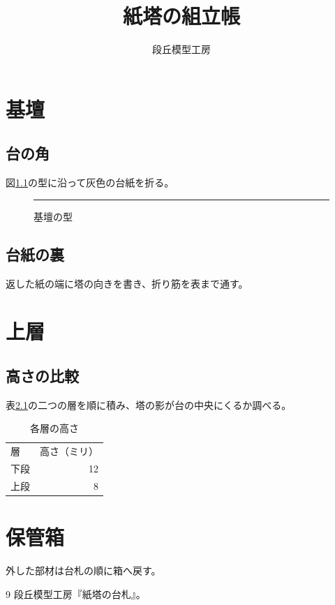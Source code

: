 \documentclass{ltjbook}
\title{紙塔の組立帳}
\author{段丘模型工房}
\date{}
\begin{document}
\frontmatter
\maketitle
\tableofcontents
\mainmatter
\chapter{基壇}
\section{台の角}
図\ref{fig:base}の型に沿って灰色の台紙を折る。
\begin{figure}[htbp]
\centering\rule{34mm}{4mm}
\caption{基壇の型}\label{fig:base}
\end{figure}
\newpage
\section{台紙の裏}
返した紙の端に塔の向きを書き、折り筋を表まで通す。
\chapter{上層}
\section{高さの比較}
表\ref{tab:height}の二つの層を順に積み、塔の影が台の中央にくるか調べる。
\begin{table}[htbp]
\centering\caption{各層の高さ}\label{tab:height}
\begin{tabular}{lr}層 & 高さ（ミリ）\\下段 & 12\\上段 & 8\end{tabular}
\end{table}
\appendix
\chapter{保管箱}
外した部材は台札\cite{box}の順に箱へ戻す。
\backmatter
\begin{thebibliography}{9}
 段丘模型工房『紙塔の台札』。
\end{thebibliography}
\end{document}
